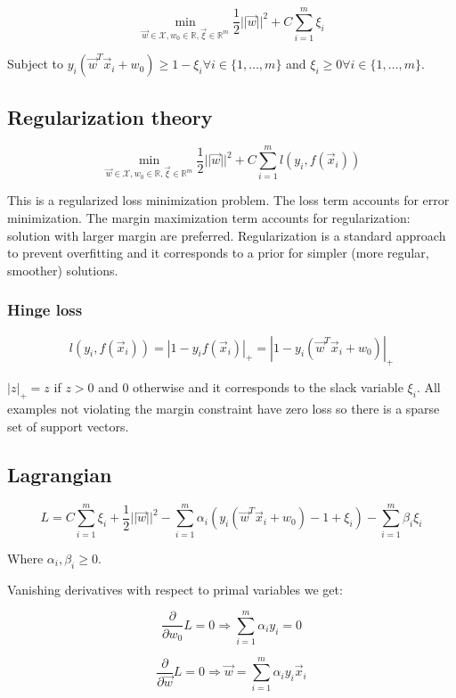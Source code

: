 	$$\min\limits_{\vec{w}\in\mathcal{X}, w_0\in\mathbb{R},\vec{\xi}\in\mathbb{R}^m}\frac{1}{2}||\vec{w}||^2+C\sum\limits_{i=1}^m\xi_i$$

	Subject to $y_i(\vec{w}^T\vec{x}_i+w_0)\ge 1-\xi_i\forall i\in\{1, \dots, m\}$ and $\xi_i\ge 0\forall i\in\{1, \dots,m\}$.

	\subsection{Regularization theory}

	$$\min\limits_{\vec{w}\in\mathcal{X}, w_0\in\mathbb{R},\vec{\xi}\in\mathbb{R}^m}\frac{1}{2}||\vec{w}||^2+C\sum\limits_{i=1}^ml(y_i, f(\vec{x}_i))$$

	This is a regularized loss minimization problem.
	The loss term accounts for error minimization.
	The margin maximization term accounts for regularization: solution with larger margin are preferred.
	Regularization is a standard approach to prevent overfitting and it corresponds to a prior for simpler (more regular, smoother) solutions.

		\subsubsection{Hinge loss}

		$$l(y_i, f(\vec{x}_i)) = |1-y_if(\vec{x}_i)|_+ = |1-y_i(\vec{w}^T\vec{x}_i+w_0)|_+$$

		$|z|_+=z$ if $z>0$ and $0$ otherwise and it corresponds to the slack variable $\xi_i$.
		All examples not violating the margin constraint have zero loss so there is a sparse set of support vectors.

	\subsection{Lagrangian}

	$$L = C\sum\limits_{i=1}^m\xi_i+\frac{1}{2}||\vec{w}||^2-\sum\limits_{i=1}^m\alpha_i(y_i(\vec{w}^T\vec{x}_i+w_0)-1+\xi_i)-\sum\limits_{i=1}^m\beta_i\xi_i$$

	Where $\alpha_i, \beta_i\ge 0$.

	Vanishing derivatives with respect to primal variables we get:

	$$\frac{\partial}{\partial w_0}L = 0 \Rightarrow \sum\limits_{i=1}^m\alpha_iy_i = 0$$

	$$\frac{\partial}{\partial\vec{w}}L = 0\Rightarrow \vec{w} = \sum\limits_{i=1}^m\alpha_iy_i\vec{x}_i$$

